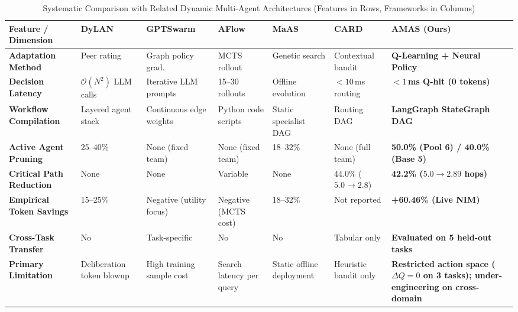 \begin{table}[!t]
\centering
\caption{Systematic Comparison with Related Dynamic Multi-Agent Architectures (Features in Rows, Frameworks in Columns)}
\label{tab:literature_comparison}
\footnotesize
\begin{tabular}{lp{2.1cm}p{2.1cm}p{2.1cm}p{2.1cm}p{2.1cm}p{3.2cm}}
\toprule
\textbf{Feature / Dimension} & \textbf{DyLAN}~\cite{liu2024dylan} & \textbf{GPTSwarm}~\cite{zhuge2024gptswarm} & \textbf{AFlow}~\cite{zhang2024aflow} & \textbf{MaAS}~\cite{Zhang2025MaAS} & \textbf{CARD}~\cite{Li2025AdaptiveGraphPruning} & \textbf{AMAS (Ours)} \\
\midrule
\textbf{Adaptation Method} & Peer rating & Graph policy grad. & MCTS rollout & Genetic search & Contextual bandit & \textbf{Q-Learning + Neural Policy} \\
\textbf{Decision Latency} & $\mathcal{O}(N^2)$ LLM calls & Iterative LLM prompts & 15--30 rollouts & Offline evolution & $<10$\,ms routing & \textbf{$<1$\,ms Q-hit (0 tokens)} \\
\textbf{Workflow Compilation} & Layered agent stack & Continuous edge weights & Python code scripts & Static specialist DAG & Routing DAG & \textbf{LangGraph StateGraph DAG} \\
\textbf{Active Agent Pruning} & 25--40\% & None (fixed team) & None (fixed team) & 18--32\% & None (full team) & \textbf{50.0\% (Pool 6) / 40.0\% (Base 5)} \\
\textbf{Critical Path Reduction} & None & None & Variable & None & 44.0\% ($5.0 \to 2.8$) & \textbf{42.2\% ($5.0 \to 2.89$ hops)} \\
\textbf{Empirical Token Savings} & 15--25\% & Negative (utility focus) & Negative (MCTS cost) & 18--32\% & Not reported & \textbf{+60.46\% (Live NIM)} \\
\textbf{Cross-Task Transfer} & No & Task-specific & No & No & Tabular only & \textbf{Evaluated on 5 held-out tasks} \\
\midrule
\textbf{Primary Limitation} & Deliberation token blowup & High training sample cost & Search latency per query & Static offline deployment & Heuristic bandit only & \textbf{Restricted action space ($\Delta Q = 0$ on 3 tasks); under-engineering on cross-domain} \\
\bottomrule
\end{tabular}
\end{table}
